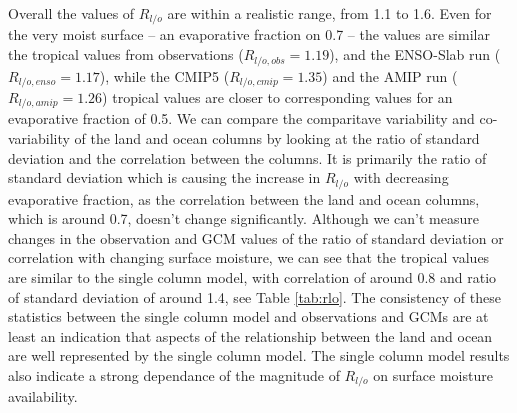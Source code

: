 Overall the values of $R_{l/o}$ are within a realistic range, from 1.1 to 1.6.
Even for the very moist surface -- an evaporative fraction on 0.7 -- the values 
are similar the tropical values from observations ($R_{l/o, obs} =1.19$), and 
the ENSO-Slab run ($R_{l/o, enso} =1.17$), while the CMIP5 ($R_{l/o,cmip} 
=1.35$) and the AMIP run ($R_{l/o, amip} =1.26$) tropical values are closer to 
corresponding values for an evaporative fraction of 0.5. We can compare the 
comparitave variability and co-variability of the land and ocean columns by 
looking at the ratio of standard deviation and the correlation between the 
columns. It is primarily the ratio of standard deviation which is causing the 
increase in $R_{l/o}$ with decreasing evaporative fraction, as the correlation 
between the land and ocean columns, which is around 0.7, doesn't change 
significantly. Although we can't measure changes in the observation and GCM 
values of the ratio of standard deviation or correlation with changing surface 
moisture, we can see that the tropical values are similar to the single column 
model, with correlation of around 0.8 and ratio of standard deviation of around 
1.4, see Table \ref{tab:rlo}.  The consistency of these statistics between the 
  single column model and observations and GCMs are at least an indication that 
  aspects of the relationship between the land and ocean are well represented by 
  the single column model. The single column model results also indicate a 
  strong dependance of the magnitude of $R_{l/o}$ on surface moisture 
  availability.


